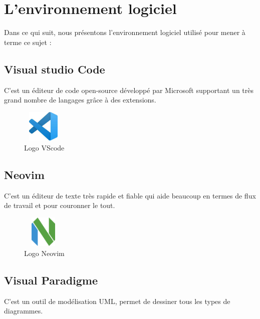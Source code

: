 \documentclass[12pt]{report}
\begin{document}
\section{L’environnement logiciel}
\vspace{0.1in}
\hspace*{0.16in}
Dans ce qui suit, nous présentons l’environnement logiciel utilisé pour mener à terme ce sujet :

\subsection{Visual studio Code}
\vspace{0.1in}
\hspace*{0.16in}
C’est un éditeur de code open-source développé par Microsoft supportant un très grand nombre de langages grâce à des extensions.

\vspace{0.1in}

\begin{figure}[h]
\centering
    \includegraphics[width = 0.8in, height = 0.6in]{../images/VScode.jpg}
\caption{Logo VScode}
\end{figure}

\subsection{Neovim}
\vspace{0.1in}
\hspace*{0.16in}
C’est un éditeur de texte très rapide et fiable qui aide beaucoup en termes de flux de travail et pour couronner le tout. 

\vspace{0.1in}

\begin{figure}[h]
\centering
    \includegraphics[width = 0.8in, height = 0.6in]{../images/Neovim.png}
\caption{Logo Neovim}
\end{figure}

\newpage

\subsection{Visual Paradigme}
\vspace{0.1in}
\hspace*{0.16in}
C’est un outil de modélisation UML, permet de dessiner tous les types de diagrammes.
\end{document}
